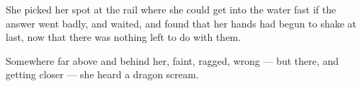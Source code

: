 She picked her spot at the rail where she could get into the water fast if the answer went badly, and waited, and found that her hands had begun to shake at last, now that there was nothing left to do with them.

Somewhere far above and behind her, faint, ragged, wrong — but there, and getting closer — she heard a dragon scream.